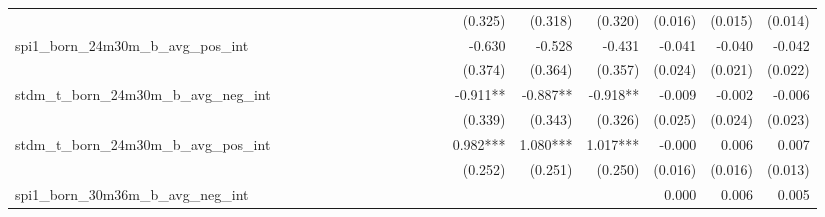 \begin{tabular}{lrrrrrrrrrrrrrrrrrr}
                                            &              &              &              &              &              &              &              &              &               &              &              &               &      (0.325) &      (0.318) &       (0.320) &      (0.016) &      (0.015) &       (0.014) \\ 
spi1\_born\_24m30m\_b\_avg\_pos\_int        &              &              &              &              &              &              &              &              &               &              &              &               &       -0.630 &       -0.528 &        -0.431 &       -0.041 &       -0.040 &        -0.042 \\ 
                                            &              &              &              &              &              &              &              &              &               &              &              &               &      (0.374) &      (0.364) &       (0.357) &      (0.024) &      (0.021) &       (0.022) \\ 
stdm\_t\_born\_24m30m\_b\_avg\_neg\_int     &              &              &              &              &              &              &              &              &               &              &              &               &     -0.911** &     -0.887** &      -0.918** &       -0.009 &       -0.002 &        -0.006 \\ 
                                            &              &              &              &              &              &              &              &              &               &              &              &               &      (0.339) &      (0.343) &       (0.326) &      (0.025) &      (0.024) &       (0.023) \\ 
stdm\_t\_born\_24m30m\_b\_avg\_pos\_int     &              &              &              &              &              &              &              &              &               &              &              &               &     0.982*** &     1.080*** &      1.017*** &       -0.000 &        0.006 &         0.007 \\ 
                                            &              &              &              &              &              &              &              &              &               &              &              &               &      (0.252) &      (0.251) &       (0.250) &      (0.016) &      (0.016) &       (0.013) \\ 
spi1\_born\_30m36m\_b\_avg\_neg\_int        &              &              &              &              &              &              &              &              &               &              &              &               &              &              &               &        0.000 &        0.006 &         0.005 \\ 

\end{tabular}
